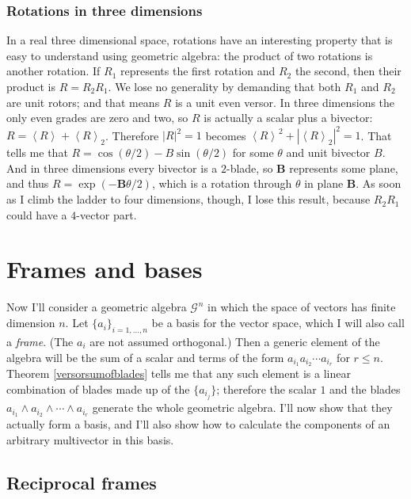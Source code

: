 \documentclass{utarticle}
\newcommand{\G}[1][]{\ensuremath{\mathcal{G}_{#1}}}
\newcommand{\bl}[1]{\ensuremath{\bm{#1}}}
\DeclareMathOperator{\out}{\wedge}
\newcommand{\grade}[2][]{\ensuremath{\left\langle #2 \right\rangle_{#1}}}
\begin{document}
\subsubsection{Rotations in three dimensions}

In a real three dimensional space, rotations have an interesting property that is easy to 
understand using geometric algebra: the product of two rotations is another
rotation.  If $R_1$ represents the first rotation and $R_2$ the second, then their
product is $R = R_2 R_1$.  We lose no generality by demanding that both $R_1$ 
and $R_2$ are unit rotors; and that means $R$ is a unit even versor.  
In three dimensions the only even grades are zero and two, so $R$ is actually a scalar 
plus a bivector: $R = \grade{R} + \grade[2]{R}$.  Therefore $|R|^2 = 1$ becomes 
$\grade{R}^2 + |\grade[2]{R}|^2 = 1$.  That tells me that $R = \cos (\theta/2) - B \sin (\theta/2)$
for some $\theta$ and unit bivector $B$.  And in three dimensions every bivector is 
a $2$-blade, so \bl{B} represents some plane, and thus $R = \exp(-\bl{B} \theta/2)$, 
which is a rotation through $\theta$ in plane \bl{B}.  As soon as I climb the ladder to four 
dimensions, though, I lose this result, because $R_2 R_1$ could have a $4$-vector part.

\section{Frames and bases}
\label{framesbases}

Now I'll consider a geometric algebra $\G^n$ in which the space of
vectors has finite dimension $n$.  Let $\{a_i\}_{i=1,\dotsc,n}$ be a
basis for the vector space, which I will also call a \emph{frame}.  (The $a_i$ are not
assumed orthogonal.)  Then a generic element of the algebra will be the
sum of a scalar and terms of the form $a_{i_1} a_{i_2} \dotsb a_{i_r}$
for $r \le n$.  Theorem \ref{versorsumofblades} tells me that any such element is a linear
combination of blades made up of the $\{a_{i_j}\}$; therefore the scalar $1$ and the 
blades $a_{i_1} \out a_{i_2} \out \dotsb \out a_{i_r}$ generate the 
whole geometric algebra.  I'll now show that they actually form a basis, 
and I'll also show how to calculate the components of an arbitrary multivector 
in this basis.

\subsection{Reciprocal frames}
\label{recipframe}
\end{document}
